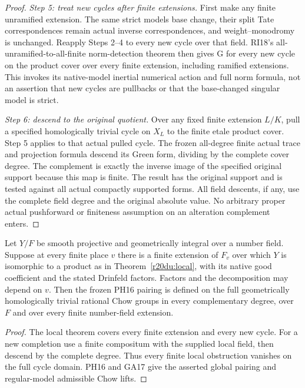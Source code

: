 \begin{proof}
\emph{Step 5: treat new cycles after finite extensions.}
First make any finite unramified extension.  The same strict
models base change, their split Tate correspondences remain
actual inverse correspondences, and weight--monodromy is
unchanged.  Reapply Steps 2--4 to every new cycle over that
field.  RI18's all-unramified-to-all-finite norm-detection
theorem then gives G for every new cycle on the product cover
over every finite extension, including ramified extensions.
This invokes its native-model inertial numerical action and
full norm formula, not an assertion that new cycles are
pullbacks or that the base-changed singular model is strict.

\emph{Step 6: descend to the original quotient.}
Over any fixed finite extension $L/K$, pull a specified
homologically trivial cycle on $X_L$ to the finite etale
product cover.  Step 5 applies to that actual pulled cycle.
The frozen all-degree finite actual trace and projection
formula descend its Green form, dividing by the complete
cover degree.  The complement is exactly the inverse image
of the specified original support because this map is finite.
The result has the original support and is tested against
all actual compactly supported forms.  All field descents,
if any, use the complete field degree and the original
absolute value.  No arbitrary proper actual pushforward
or finiteness assumption on an alteration complement enters.
\end{proof}

\begin{corollary}
\label{r20du:height}
Let $Y/F$ be smooth projective and geometrically integral over
a number field.  Suppose at every finite place $v$ there is
a finite extension of $F_v$ over which $Y$ is isomorphic to
a product as in Theorem~\ref{r20du:local}, with its native
good coefficient and the stated Drinfeld factors.  Factors
and the decomposition may depend on $v$.
Then the frozen PH16 pairing is defined on the full
geometrically homologically trivial rational Chow groups in
every complementary degree, over $F$ and over every finite
number-field extension.
\end{corollary}

\begin{proof}
The local theorem covers every finite extension and every new
cycle.  For a new completion use a finite compositum with the
supplied local field, then descend by the complete degree.
Thus every finite local obstruction vanishes on the full
cycle domain.  PH16 and GA17 give the asserted global
pairing and regular-model admissible Chow lifts.
\end{proof}

